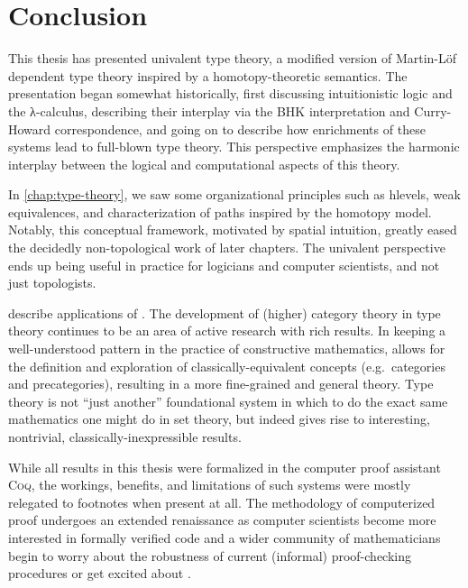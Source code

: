 \documentclass[12pt,twoside]{reedthesis}
\let\oldindex\index
\renewcommand{\index}[1]
               {\oldindex{#1}\marginpar{\footnotesize\color{index}index: #1}}
\newcommand{\indeX}{\oldindex}
\newcommand{\indeX}{\index}
\newcommand{\software}[1]{{\textsc{#1}}\indeX{#1}}
\newcommand{\Coq}{\software{Coq}}
\begin{document}





\chapter*{Conclusion}
\setcounter{chapter}{5}
\setcounter{section}{0}

This thesis has presented univalent type theory, a modified version of Martin-Löf
dependent type theory inspired by a homotopy-theoretic semantics. The
presentation began somewhat historically, first discussing intuitionistic
logic and the λ-calculus, describing their interplay via the BHK interpretation
and Curry-Howard correspondence, and going on to describe how enrichments of
these systems lead to full-blown type theory. This perspective emphasizes
the harmonic interplay between the logical and computational aspects of this
theory. 

In \cref{chap:type-theory}, we saw some organizational principles such as
hlevels, weak equivalences, and characterization of paths inspired by the
homotopy model. Notably, this conceptual framework, motivated by spatial
intuition, greatly eased the decidedly non-topological work of later chapters. 
The univalent perspective ends up being useful in practice for logicians and
computer scientists, and not just topologists.

describe applications of \UTT{}. The development of (higher) category theory in
type theory continues to be an area of active research with rich results.
In keeping a well-understood pattern in the practice of constructive mathematics,
\UTT{} allows for the definition and exploration of classically-equivalent
concepts (e.g.\ categories and precategories), resulting in a more fine-grained
and general theory. Type theory is not ``just another'' foundational system in
which to do the exact same mathematics one might do in set theory, but indeed
gives rise to interesting, nontrivial, classically-inexpressible results.

While all results in this thesis were formalized in the computer proof assistant
\Coq{}, the workings, benefits, and limitations of such systems were mostly
relegated to footnotes when present at all. The methodology of computerized proof
undergoes an extended renaissance as computer scientists become more
interested in formally verified code and a wider community of mathematicians
begin to worry about the robustness of current (informal) proof-checking
procedures or get excited about \HoTT{}.
\end{document}
